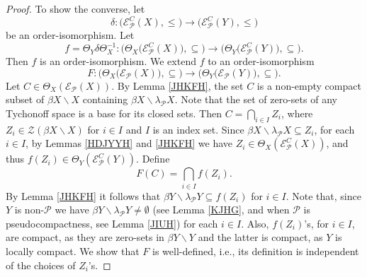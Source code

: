 \documentclass{amsart}
\theoremstyle{definition}
\theoremstyle{remark}
\theoremstyle{notation}
\numberwithin{equation}{section}
\begin{document}
\begin{proof}
To show  the converse, let
\[\delta:\big({\mathscr E}^C_{{\mathcal P}}(X),\leq\big)\rightarrow\big({\mathscr E}^C_{{\mathcal P}}(Y),\leq\big)\]
be an order-isomorphism.  Let
\[f=\Theta_Y\delta\Theta_X^{-1}:\big(\Theta_X\big({\mathscr E}^C_{{\mathcal P}}(X)\big),\subseteq\big)\rightarrow\big(\Theta_Y\big({\mathscr E}^C_{{\mathcal P}}(Y)\big),\subseteq\big).\]
Then $f$ is an order-isomorphism. We extend $f$ to an order-isomorphism
\[F:\big(\Theta_X\big({\mathscr E}_{{\mathcal P}}(X)\big),\subseteq\big)\rightarrow\big(\Theta_Y\big({\mathscr E}_{{\mathcal P}}(Y)\big),\subseteq\big).\]
Let $C\in \Theta_X({\mathscr E}_{{\mathcal P}}(X))$. By Lemma \ref{JHKFH}, the set $C$ is a non-empty compact subset of
$\beta X\backslash X$ containing $\beta X\backslash\lambda_{{\mathcal P}} X$. Note that the set of zero-sets of any
Tychonoff space is a base for its closed sets. Then  $C=\bigcap_{i\in I}Z_i$, where
$Z_i\in {\mathscr Z}(\beta X\backslash X)$ for $i\in I$ and $I$ is an index set. Since  $\beta X\backslash\lambda_{{\mathcal P}} X\subseteq Z_i$,
for each $i\in I$, by Lemmas \ref{HDJYYH} and \ref{JHKFH} we have $Z_i\in \Theta_X({\mathscr E}^C_{{\mathcal P}}(X))$,
and thus  $f(Z_i)\in \Theta_Y({\mathscr E}^C_{{\mathcal P}}(Y))$. Define
\[F(C)= \bigcap_{i\in I}f(Z_i).\]
By Lemma  \ref{JHKFH} it follows that  $\beta Y\backslash\lambda_{{\mathcal P}} Y\subseteq f(Z_i)$ for  $i\in I$. Note that, since $Y$ is non-${\mathcal P}$ we have
$\beta Y\backslash\lambda_{{\mathcal P}} Y\neq\emptyset$ (see Lemma \ref{KJHG}, and  when ${\mathcal P}$ is pseudocompactness,
see Lemma \ref{JIUH}) for each $i\in I$. Also, $f(Z_i)$'s, for $i\in I$, are compact, as they are zero-sets in $\beta Y\backslash Y$ and the latter is compact, as  $Y$ is locally compact. We show that $F$ is well-defined, i.e.,
its definition is independent of the choices of $Z_i$'s.


\end{proof}
\end{document}
